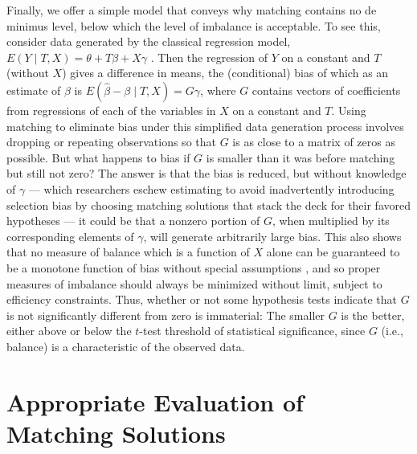 \documentclass[11pt,titlepage]{article}
\begin{document}
Finally, we offer a simple model that conveys why matching contains no
de minimus level, below which the level of imbalance is acceptable.
To see this, consider data generated by the classical regression
model, $E(Y\mid T,X)= \theta + T\beta + X\gamma$ \citep{Goldberger91}.
Then the regression of $Y$ on a constant and $T$ (without $X$) gives a
difference in means, the (conditional) bias of which as an estimate of
$\beta$ is $E(\hat\beta-\beta\mid T,X) = G\gamma$, where $G$ contains
vectors of coefficients from regressions of each of the variables in
$X$ on a constant and $T$.  Using matching to eliminate bias under
this simplified data generation process involves dropping or repeating
observations so that $G$ is as close to a matrix of zeros as possible.
But what happens to bias if $G$ is smaller than it was before matching
but still not zero?  The answer is that the bias is reduced, but
without knowledge of $\gamma$ --- which researchers eschew estimating
to avoid inadvertently introducing selection bias by choosing matching
solutions that stack the deck for their favored hypotheses --- it
could be that a nonzero portion of $G$, when multiplied by its
corresponding elements of $\gamma$, will generate arbitrarily large
bias.  This also shows that no measure of balance which is a function
of $X$ alone can be guaranteed to be a monotone function of bias
without special assumptions \citep{RubStu06}, and so proper measures
of imbalance should always be minimized without limit, subject to
efficiency constraints.  Thus, whether or not some hypothesis tests
indicate that $G$ is not significantly different from zero is
immaterial: The smaller $G$ is the better, either above or below the
$t$-test threshold of statistical significance, since $G$ (i.e.,
balance) is a characteristic of the observed data.

\section{Appropriate Evaluation of Matching Solutions}
\end{document}
